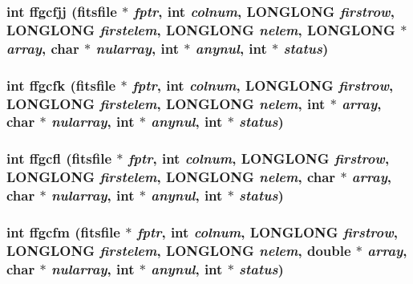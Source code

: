 \subsubsection{\setlength{\rightskip}{0pt plus 5cm}int ffgcfjj (\bf{fitsfile} $\ast$ {\em fptr}, int {\em colnum}, \bf{LONGLONG} {\em firstrow}, \bf{LONGLONG} {\em firstelem}, \bf{LONGLONG} {\em nelem}, \bf{LONGLONG} $\ast$ {\em array}, char $\ast$ {\em nularray}, int $\ast$ {\em anynul}, int $\ast$ {\em status})}\label{src_2fitsio_8h_183f63b8d28146b3bc28b7c1824ec5a5}


\subsubsection{\setlength{\rightskip}{0pt plus 5cm}int ffgcfk (\bf{fitsfile} $\ast$ {\em fptr}, int {\em colnum}, \bf{LONGLONG} {\em firstrow}, \bf{LONGLONG} {\em firstelem}, \bf{LONGLONG} {\em nelem}, int $\ast$ {\em array}, char $\ast$ {\em nularray}, int $\ast$ {\em anynul}, int $\ast$ {\em status})}\label{src_2fitsio_8h_95d67baf3df70588e3023872ee7b6f99}


\subsubsection{\setlength{\rightskip}{0pt plus 5cm}int ffgcfl (\bf{fitsfile} $\ast$ {\em fptr}, int {\em colnum}, \bf{LONGLONG} {\em firstrow}, \bf{LONGLONG} {\em firstelem}, \bf{LONGLONG} {\em nelem}, char $\ast$ {\em array}, char $\ast$ {\em nularray}, int $\ast$ {\em anynul}, int $\ast$ {\em status})}\label{src_2fitsio_8h_c0a8d48d75ed3407c9a04b6a124f213b}


\subsubsection{\setlength{\rightskip}{0pt plus 5cm}int ffgcfm (\bf{fitsfile} $\ast$ {\em fptr}, int {\em colnum}, \bf{LONGLONG} {\em firstrow}, \bf{LONGLONG} {\em firstelem}, \bf{LONGLONG} {\em nelem}, double $\ast$ {\em array}, char $\ast$ {\em nularray}, int $\ast$ {\em anynul}, int $\ast$ {\em status})}\label{src_2fitsio_8h_9fa695567e585865b42581e882565f0d}


